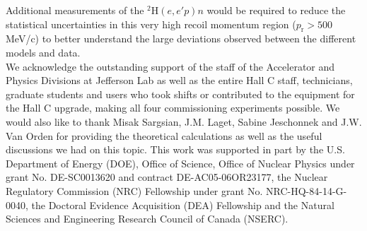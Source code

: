 \documentclass[aps,prl,twocolumn,showpacs,superscriptaddress,groupedaddress]{revtex4-2}  %
\begin{document}
Additional measurements of the $^{2}\mathrm{H}(e,e'p)n$ would be required to reduce the statistical uncertainties in this very high recoil
momentum region ($p_{\mathrm{r}}>500$ MeV/c) to better understand the large deviations observed between the different models and data.\\
\indent We acknowledge the outstanding support of the staff of the Accelerator and Physics Divisions at Jefferson Lab
as well as the entire Hall C staff, technicians, graduate students and users who took shifts or contributed
to the equipment for the Hall C upgrade, making all four commissioning experiments possible. We would also like to
thank Misak Sargsian, J.M. Laget, Sabine Jeschonnek and J.W. Van Orden for providing the theoretical calculations as well as the useful
discussions we had on this topic. This work was supported in part by the U.S. Department of Energy (DOE), Office of Science, Office of Nuclear Physics
under grant No. DE-SC0013620 and contract DE-AC05-06OR23177, the Nuclear Regulatory Commission (NRC) Fellowship
under grant No. NRC-HQ-84-14-G-0040, the Doctoral Evidence Acquisition (DEA) Fellowship and the Natural Sciences and Engineering Research Council of Canada (NSERC).


\nocite{barlow2002systematic}
\nocite{barlow2017}


\end{document}
